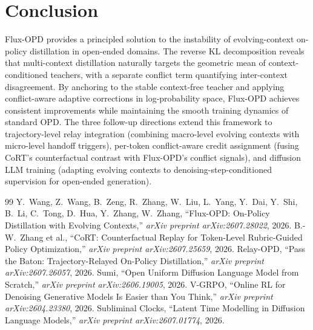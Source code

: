 \documentclass[11pt,a4paper]{article}
\begin{document}
\section{Conclusion}
Flux-OPD provides a principled solution to the instability of evolving-context on-policy distillation in open-ended domains. The reverse KL decomposition reveals that multi-context distillation naturally targets the geometric mean of context-conditioned teachers, with a separate conflict term quantifying inter-context disagreement. By anchoring to the stable context-free teacher and applying conflict-aware adaptive corrections in log-probability space, Flux-OPD achieves consistent improvements while maintaining the smooth training dynamics of standard OPD. The three follow-up directions extend this framework to trajectory-level relay integration (combining macro-level evolving contexts with micro-level handoff triggers), per-token conflict-aware credit assignment (fusing CoRT's counterfactual contrast with Flux-OPD's conflict signals), and diffusion LLM training (adapting evolving contexts to denoising-step-conditioned supervision for open-ended generation).

\begin{thebibliography}{99}
 Y.\ Wang, Z.\ Wang, B.\ Zeng, R.\ Zhang, W.\ Liu, L.\ Yang, Y.\ Dai, Y.\ Shi, B.\ Li, C.\ Tong, D.\ Hua, Y.\ Zhang, W.\ Zhang, ``Flux-OPD: On-Policy Distillation with Evolving Contexts,'' \emph{arXiv preprint arXiv:2607.28022}, 2026.
 B.-W.\ Zhang et al., ``CoRT: Counterfactual Replay for Token-Level Rubric-Guided Policy Optimization,'' \emph{arXiv preprint arXiv:2607.25659}, 2026.
 Relay-OPD, ``Pass the Baton: Trajectory-Relayed On-Policy Distillation,'' \emph{arXiv preprint arXiv:2607.26057}, 2026.
 Sumi, ``Open Uniform Diffusion Language Model from Scratch,'' \emph{arXiv preprint arXiv:2606.19005}, 2026.
 V-GRPO, ``Online RL for Denoising Generative Models Is Easier than You Think,'' \emph{arXiv preprint arXiv:2604.23380}, 2026.
 Subliminal Clocks, ``Latent Time Modelling in Diffusion Language Models,'' \emph{arXiv preprint arXiv:2607.01774}, 2026.
\end{thebibliography}
\end{document}
